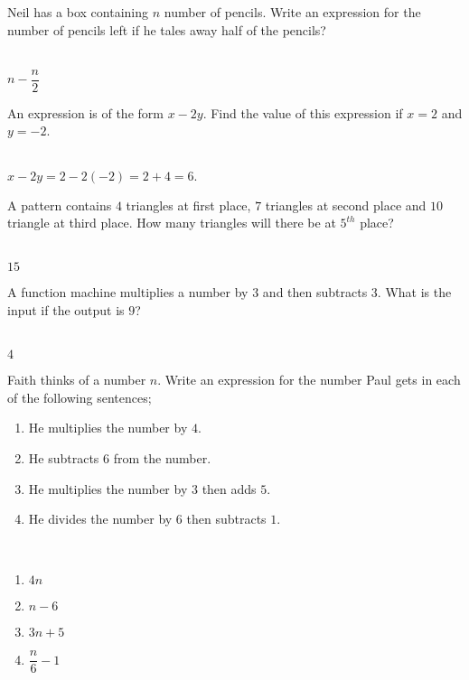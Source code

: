 \documentclass[addpoints,12pt]{exam}
\begin{document}
\begin{questions}
 \question Neil has a box containing $n$ number of pencils. Write an expression for the 
number of pencils left if he tales away half of the pencils?
	\ifprintanswers
	  \begin{solution}\\
		$n-\dfrac{n}{2}$
	  \end{solution}
	\else
	  \makeemptybox{1.33in}
	\fi
 
 \question An expression is of the form $x-2y$. Find the value of this expression if $x=2$ 
and $y=-2$.
	\ifprintanswers
	  \begin{solution}\\
		$x-2y=2-2(-2)=2+4=6.$
	  \end{solution}
	\else
	  \makeemptybox{1.33in}
	\fi
 
 \question A pattern contains $4$ triangles at first place, $7$ triangles at second place and $10$ 
triangle at third place. How many triangles will there be at $5^{th}$ place?
	\ifprintanswers
	  \begin{solution}\\
		$15$
	  \end{solution}
	\else
	  \makeemptybox{1.33in}
	\fi
 \question A function machine multiplies a number by $3$ and then subtracts $3$. What is the input 
if the output is $9$? 
	\ifprintanswers
	  \begin{solution}\\
		$4$
	  \end{solution}
	\else
	  \makeemptybox{1.33in}
	\fi
 \question Faith thinks of a number $n$. Write an expression for the number Paul gets in each of 
the following sentences;
	\begin{enumerate}
	 \item He multiplies the number by $4$.
	 \item He subtracts $6$ from the number.
	 \item He multiplies the number by $3$ then adds $5$.
	 \item He divides the number by $6$ then subtracts $1$.
	\end{enumerate}

	\ifprintanswers
	  \begin{solution}\\
		\begin{enumerate}
		 \item $4n$
		 \item $n-6$
		 \item $3n+5$
		 \item $\dfrac{n}{6}-1$
		\end{enumerate}


\end{solution}
\end{questions}
\end{document}
